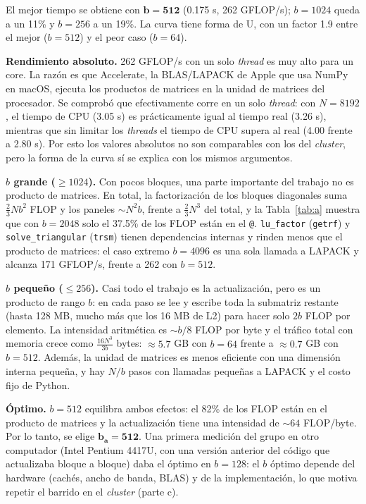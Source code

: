\documentclass[11pt,a4paper]{article}
\begin{document}
El mejor tiempo se obtiene con $\boldsymbol{b=512}$ (0.175 s, 262 GFLOP/s); $b=1024$ queda a un 11\% y $b=256$ a un 19\%. La curva tiene forma de U, con un factor 1.9 entre el mejor ($b=512$) y el peor caso ($b=64$).

\textbf{Rendimiento absoluto.} 262 GFLOP/s con un solo \emph{thread} es muy alto para un core. La razón es que Accelerate, la BLAS/LAPACK de Apple que usa NumPy en macOS, ejecuta los productos de matrices en la unidad de matrices del procesador. Se comprobó que efectivamente corre en un solo \emph{thread}: con $N=8192$, el tiempo de CPU (3.05 s) es prácticamente igual al tiempo real (3.26 s), mientras que sin limitar los \emph{threads} el tiempo de CPU supera al real (4.00 frente a 2.80 s). Por esto los valores absolutos no son comparables con los del \emph{cluster}, pero la forma de la curva sí se explica con los mismos argumentos.

\textbf{$b$ grande ($\ge1024$).} Con pocos bloques, una parte importante del trabajo no es producto de matrices. En total, la factorización de los bloques diagonales suma $\tfrac{2}{3}Nb^2$ FLOP y los paneles $\sim N^2b$, frente a $\tfrac{2}{3}N^3$ del total, y la Tabla~\ref{tab:a} muestra que con $b=2048$ solo el 37.5\% de los FLOP están en el \texttt{@}. \texttt{lu\_factor} (\texttt{getrf}) y \texttt{solve\_triangular} (\texttt{trsm}) tienen dependencias internas y rinden menos que el producto de matrices: el caso extremo $b=4096$ es una sola llamada a LAPACK y alcanza 171 GFLOP/s, frente a 262 con $b=512$.

\textbf{$b$ pequeño ($\le256$).} Casi todo el trabajo es la actualización, pero es un producto de rango $b$: en cada paso se lee y escribe toda la submatriz restante (hasta 128 MB, mucho más que los 16 MB de L2) para hacer solo $2b$ FLOP por elemento. La intensidad aritmética es $\sim b/8$ FLOP por byte y el tráfico total con memoria crece como $\tfrac{16N^3}{3b}$ bytes: $\approx5.7$ GB con $b=64$ frente a $\approx0.7$ GB con $b=512$. Además, la unidad de matrices es menos eficiente con una dimensión interna pequeña, y hay $N/b$ pasos con llamadas pequeñas a LAPACK y el costo fijo de Python.

\textbf{Óptimo.} $b=512$ equilibra ambos efectos: el 82\% de los FLOP están en el producto de matrices y la actualización tiene una intensidad de $\sim64$ FLOP/byte. Por lo tanto, se elige $\boldsymbol{b_a=512}$. Una primera medición del grupo en otro computador (Intel Pentium 4417U, con una versión anterior del código que actualizaba bloque a bloque) daba el óptimo en $b=128$: el $b$ óptimo depende del hardware (cachés, ancho de banda, BLAS) y de la implementación, lo que motiva repetir el barrido en el \emph{cluster} (parte c).
\end{document}
